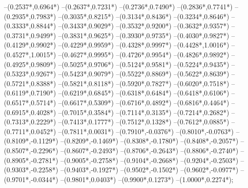 {	--({0.2537*\xskala},{0.6964*\yskala})
	--({0.2637*\xskala},{0.7231*\yskala})
	--({0.2736*\xskala},{0.7490*\yskala})
	--({0.2836*\xskala},{0.7741*\yskala})
	--({0.2935*\xskala},{0.7983*\yskala})
	--({0.3035*\xskala},{0.8215*\yskala})
	--({0.3134*\xskala},{0.8436*\yskala})
	--({0.3234*\xskala},{0.8646*\yskala})
	--({0.3333*\xskala},{0.8844*\yskala})
	--({0.3433*\xskala},{0.9029*\yskala})
	--({0.3532*\xskala},{0.9200*\yskala})
	--({0.3632*\xskala},{0.9357*\yskala})
	--({0.3731*\xskala},{0.9499*\yskala})
	--({0.3831*\xskala},{0.9625*\yskala})
	--({0.3930*\xskala},{0.9735*\yskala})
	--({0.4030*\xskala},{0.9827*\yskala})
	--({0.4129*\xskala},{0.9902*\yskala})
	--({0.4229*\xskala},{0.9959*\yskala})
	--({0.4328*\xskala},{0.9997*\yskala})
	--({0.4428*\xskala},{1.0016*\yskala})
	--({0.4527*\xskala},{1.0015*\yskala})
	--({0.4627*\xskala},{0.9995*\yskala})
	--({0.4726*\xskala},{0.9954*\yskala})
	--({0.4826*\xskala},{0.9892*\yskala})
	--({0.4925*\xskala},{0.9809*\yskala})
	--({0.5025*\xskala},{0.9706*\yskala})
	--({0.5124*\xskala},{0.9581*\yskala})
	--({0.5224*\xskala},{0.9435*\yskala})
	--({0.5323*\xskala},{0.9267*\yskala})
	--({0.5423*\xskala},{0.9079*\yskala})
	--({0.5522*\xskala},{0.8869*\yskala})
	--({0.5622*\xskala},{0.8639*\yskala})
	--({0.5721*\xskala},{0.8388*\yskala})
	--({0.5821*\xskala},{0.8118*\yskala})
	--({0.5920*\xskala},{0.7827*\yskala})
	--({0.6020*\xskala},{0.7518*\yskala})
	--({0.6119*\xskala},{0.7190*\yskala})
	--({0.6219*\xskala},{0.6845*\yskala})
	--({0.6318*\xskala},{0.6484*\yskala})
	--({0.6418*\xskala},{0.6106*\yskala})
	--({0.6517*\xskala},{0.5714*\yskala})
	--({0.6617*\xskala},{0.5309*\yskala})
	--({0.6716*\xskala},{0.4892*\yskala})
	--({0.6816*\xskala},{0.4464*\yskala})
	--({0.6915*\xskala},{0.4028*\yskala})
	--({0.7015*\xskala},{0.3584*\yskala})
	--({0.7114*\xskala},{0.3135*\yskala})
	--({0.7214*\xskala},{0.2682*\yskala})
	--({0.7313*\xskala},{0.2229*\yskala})
	--({0.7413*\xskala},{0.1777*\yskala})
	--({0.7512*\xskala},{0.1328*\yskala})
	--({0.7612*\xskala},{0.0885*\yskala})
	--({0.7711*\xskala},{0.0452*\yskala})
	--({0.7811*\xskala},{0.0031*\yskala})
	--({0.7910*\xskala},{-0.0376*\yskala})
	--({0.8010*\xskala},{-0.0763*\yskala})
	--({0.8109*\xskala},{-0.1129*\yskala})
	--({0.8209*\xskala},{-0.1469*\yskala})
	--({0.8308*\xskala},{-0.1780*\yskala})
	--({0.8408*\xskala},{-0.2057*\yskala})
	--({0.8507*\xskala},{-0.2296*\yskala})
	--({0.8607*\xskala},{-0.2493*\yskala})
	--({0.8706*\xskala},{-0.2643*\yskala})
	--({0.8806*\xskala},{-0.2740*\yskala})
	--({0.8905*\xskala},{-0.2781*\yskala})
	--({0.9005*\xskala},{-0.2758*\yskala})
	--({0.9104*\xskala},{-0.2668*\yskala})
	--({0.9204*\xskala},{-0.2503*\yskala})
	--({0.9303*\xskala},{-0.2258*\yskala})
	--({0.9403*\xskala},{-0.1927*\yskala})
	--({0.9502*\xskala},{-0.1502*\yskala})
	--({0.9602*\xskala},{-0.0977*\yskala})
	--({0.9701*\xskala},{-0.0344*\yskala})
	--({0.9801*\xskala},{0.0403*\yskala})
	--({0.9900*\xskala},{0.1273*\yskala})
	--({1.0000*\xskala},{0.2274*\yskala});
}
